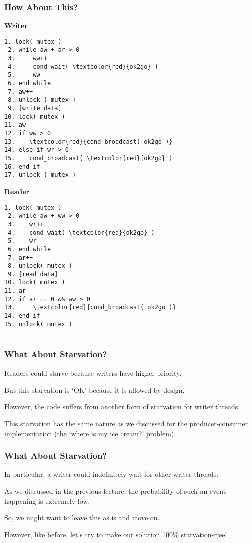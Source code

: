 \begin{frame}[fragile]
	\frametitle{How About This?}

	\begin{multicols}{2}
		\small
		\textbf{Writer}
		\begin{Verbatim}[commandchars=\\\{\}]
 1. lock( mutex )
 2. while aw + ar > 0
 3.     ww++
 4.     cond_wait( \textcolor{red}{ok2go} )
 5.     ww--
 6. end while
 7. aw++
 8. unlock ( mutex )
 9. [write data]
10. lock( mutex )
11. aw--
12. if ww > 0
13.    \textcolor{red}{cond_broadcast( ok2go )}
14. else if wr > 0
15.    cond_broadcast( \textcolor{red}{ok2go} )
16. end if
17. unlock ( mutex )
		\end{Verbatim}
		\columnbreak
		\textbf{Reader}
		\begin{Verbatim}[commandchars=\\\{\}]
 1. lock( mutex )
 2. while aw + ww > 0
 3.    wr++
 4.    cond_wait( \textcolor{red}{ok2go} )
 5.    wr--
 6. end while
 7. ar++
 8. unlock( mutex )
 9. [read data]
10. lock( mutex )
11. ar--
12. if ar == 0 && ww > 0
13.     \textcolor{red}{cond_broadcast( ok2go )}
14. end if
15. unlock( mutex )


		\end{Verbatim}
	\end{multicols}
	\vspace{-2em}
\end{frame}


\begin{frame}[fragile]
	\frametitle{What About Starvation?}
	Readers could starve because writers have higher priority.

	But this starvation is `OK' because it is allowed by design.

	However, the code suffers from another form of starvation for writer threads.

	This starvation has the same nature as we discussed for the producer-consumer implementation (the `where is my ice cream?' problem).
\end{frame}


\begin{frame}
	\frametitle{What About Starvation?}
	In particular, a writer could indefinitely wait for other writer threads.

	As we discussed in the previous lecture, the probability of such an event happening is extremely low.

	So, we might want to leave this as is and move on.

	However, like before, let's try to make our solution 100\% starvation-free!
\end{frame}


